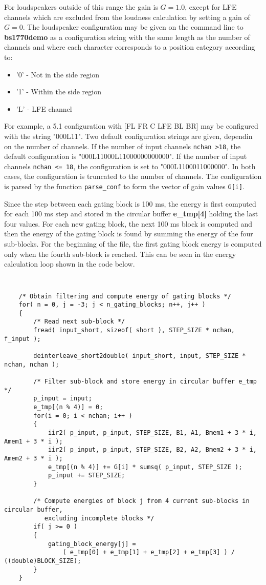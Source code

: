 For loudspeakers outside of this range the gain is $G=1.0$, except for LFE channels which are excluded
from the loudness calculation by setting a gain of $G=0$. The loudspeaker configuration may be given on
the command line to \textbf{bs1770demo} as a configuration string with the same length as the number of
channels and where each character corresponds to a position category according to:

\begin{itemize}
    \item '0' - Not in the side region
    \item '1' - Within the side region
    \item 'L' - LFE channel
\end{itemize}

For example, a 5.1 configuration with [FL FR C LFE BL BR] may be configured with the string "000L11".
Two default configuration strings are given, dependin on the number of channels. If the number of input
channels \texttt{nchan \textgreater 18}, the default configuration is "000L11000L11000000000000". If the 
number of input channels \texttt{nchan \textless = 18}, the configuration is set to "000L1100011000000". 
In both cases, the configuration is truncated to the number of channels. The configuration is parsed by
the function \texttt{parse\_conf} to form the vector of gain values \texttt{G[i]}.

Since the step between each gating block is 100 ms, the energy is first computed for each 100 ms
step and stored in the circular buffer \textbf{e\_tmp[4]} holding the last four values. For each
new gating block, the next 100 ms block is computed and then the energy of the gating block is found
by summing the energy of the four sub-blocks. For the beginning of the file, the first gating block
energy is computed only when the fourth sub-block is reached. This can be seen in the energy calculation
loop shown in the code below.

{\tt\small
\begin{verbatim}
    /* Obtain filtering and compute energy of gating blocks */
    for( n = 0, j = -3; j < n_gating_blocks; n++, j++ )
    {
        /* Read next sub-block */
        fread( input_short, sizeof( short ), STEP_SIZE * nchan, f_input );

        deinterleave_short2double( input_short, input, STEP_SIZE * nchan, nchan );

        /* Filter sub-block and store energy in circular buffer e_tmp */
        p_input = input;
        e_tmp[(n % 4)] = 0;
        for(i = 0; i < nchan; i++ )
        {
            iir2( p_input, p_input, STEP_SIZE, B1, A1, Bmem1 + 3 * i, Amem1 + 3 * i );
            iir2( p_input, p_input, STEP_SIZE, B2, A2, Bmem2 + 3 * i, Amem2 + 3 * i );
            e_tmp[(n % 4)] += G[i] * sumsq( p_input, STEP_SIZE );
            p_input += STEP_SIZE;
        }

        /* Compute energies of block j from 4 current sub-blocks in circular buffer, 
           excluding incomplete blocks */
        if( j >= 0 )
        {
            gating_block_energy[j] = 
                ( e_tmp[0] + e_tmp[1] + e_tmp[2] + e_tmp[3] ) / ((double)BLOCK_SIZE);
        }
    }
\end{verbatim}
}

